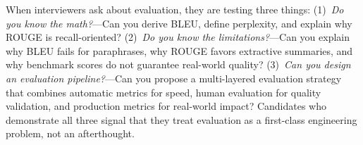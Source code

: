 \begin{keyinsight}
When interviewers ask about evaluation, they are testing three things:
(1)~\emph{Do you know the math?}---Can you derive BLEU, define perplexity,
and explain why ROUGE is recall-oriented?
(2)~\emph{Do you know the limitations?}---Can you explain why BLEU fails for
paraphrases, why ROUGE favors extractive summaries, and why benchmark scores
do not guarantee real-world quality?
(3)~\emph{Can you design an evaluation pipeline?}---Can you propose a
multi-layered evaluation strategy that combines automatic metrics for speed,
human evaluation for quality validation, and production metrics for real-world
impact?  Candidates who demonstrate all three signal that they treat evaluation
as a first-class engineering problem, not an afterthought.
\end{keyinsight}
